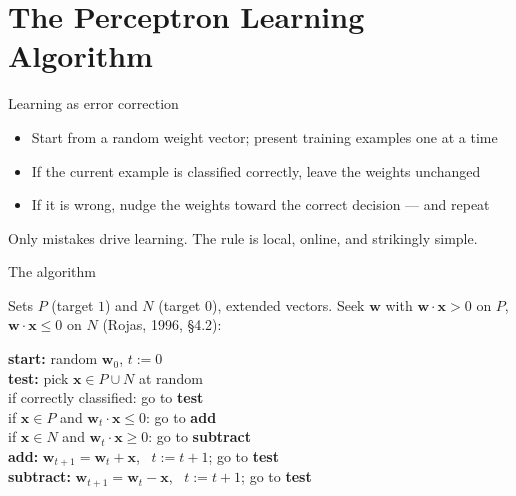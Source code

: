 \documentclass[aspectratio=169, 11pt]{beamer}
\newcommand{\src}[3]{}      %
\begin{document}
\section{The Perceptron Learning Algorithm}

\begin{frame}{Learning as error correction}
  \src{rojas1996}{algorithm}{4.2.1}
  \src{rojas1996}{section}{4.2}
  \begin{itemize}
    \item Start from a random weight vector; present training
          examples one at a time
    \item If the current example is classified
          \alert{correctly}, leave the weights unchanged
    \item If it is \alert{wrong}, nudge the weights toward
          the correct decision --- and repeat
  \end{itemize}
  \vspace{0.3em}
  \begin{redhighlight}
    Only mistakes drive learning. The rule is local, online,
    and strikingly simple.
  \end{redhighlight}
\end{frame}

\begin{frame}{The algorithm}
  \src{rojas1996}{algorithm}{4.2.1}
  \src{rojas1996}{section}{4.2}
  Sets $P$ (target $1$) and $N$ (target $0$), extended
  vectors. Seek $\mathbf{w}$ with
  $\mathbf{w}\!\cdot\!\mathbf{x}>0$ on $P$,
  $\mathbf{w}\!\cdot\!\mathbf{x}\le 0$ on $N$
  (Rojas, 1996, \S4.2):
  \vspace{0.2em}
  \begin{tcolorbox}[colback=pcc!4, colframe=pcc!40,
                    boxrule=0.5pt, arc=1mm, left=3mm]
  {\small
  \textbf{start:} random $\mathbf{w}_0$, \; $t:=0$\\[2pt]
  \textbf{test:} pick $\mathbf{x}\in P\cup N$ at random\\
  \quad if correctly classified: go to \textbf{test}\\
  \quad if $\mathbf{x}\in P$ and $\mathbf{w}_t\!\cdot\!\mathbf{x}\le 0$:
        go to \textbf{add}\\
  \quad if $\mathbf{x}\in N$ and $\mathbf{w}_t\!\cdot\!\mathbf{x}\ge 0$:
        go to \textbf{subtract}\\[2pt]
  \textbf{add:} $\mathbf{w}_{t+1}=\mathbf{w}_t+\mathbf{x}$,
        \ $t{:=}t{+}1$; go to \textbf{test}\\[2pt]
  \textbf{subtract:} $\mathbf{w}_{t+1}=\mathbf{w}_t-\mathbf{x}$,
        \ $t{:=}t{+}1$; go to \textbf{test}}
  \end{tcolorbox}
\end{frame}
\end{document}
